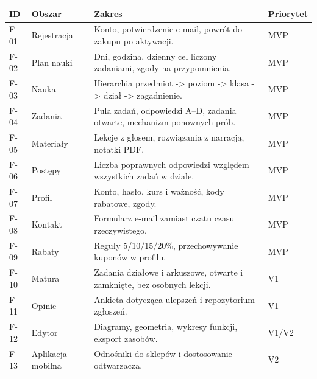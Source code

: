 \documentclass[12pt,a4paper]{report}
\begin{document}
\begin{longtable}{@{}p{}p{}p{}p{}@{}}
\toprule
\textbf{ID} & \textbf{Obszar} & \textbf{Zakres} & \textbf{Priorytet}\\
\midrule
\endhead
F-01 & Rejestracja & Konto, potwierdzenie e-mail, powrót do zakupu po aktywacji. & MVP\\
F-02 & Plan nauki & Dni, godzina, dzienny cel liczony zadaniami, zgody na przypomnienia. & MVP\\
F-03 & Nauka & Hierarchia przedmiot -> poziom -> klasa -> dział -> zagadnienie. & MVP\\
F-04 & Zadania & Pula zadań, odpowiedzi A--D, zadania otwarte, mechanizm ponownych prób. & MVP\\
F-05 & Materiały & Lekcje z głosem, rozwiązania z narracją, notatki PDF. & MVP\\
F-06 & Postępy & Liczba poprawnych odpowiedzi względem wszystkich zadań w dziale. & MVP\\
F-07 & Profil & Konto, hasło, kurs i ważność, kody rabatowe, zgody. & MVP\\
F-08 & Kontakt & Formularz e-mail zamiast czatu czasu rzeczywistego. & MVP\\
F-09 & Rabaty & Reguły 5/10/15/20\%, przechowywanie kuponów w profilu. & MVP\\
F-10 & Matura & Zadania działowe i arkuszowe, otwarte i zamknięte, bez osobnych lekcji. & V1\\
F-11 & Opinie & Ankieta dotycząca ulepszeń i repozytorium zgłoszeń. & V1\\
F-12 & Edytor & Diagramy, geometria, wykresy funkcji, eksport zasobów. & V1/V2\\
F-13 & Aplikacja mobilna & Odnośniki do sklepów i dostosowanie odtwarzacza. & V2\\
\bottomrule
\end{longtable}
\end{document}

